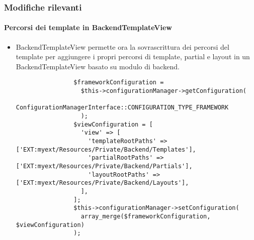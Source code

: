 \begin{frame}[fragile]
	\frametitle{Modifiche rilevanti}
	\framesubtitle{Percorsi dei template in BackendTemplateView}

	\lstset{basicstyle=\tiny\ttfamily}

	\begin{itemize}
		\item BackendTemplateView permette ora la sovrascrittura dei percorsi del template per aggiungere i propri percorsi di template,
			partial e layout in un BackendTemplateView basato su modulo di backend.

			\begin{lstlisting}
				$frameworkConfiguration =
				  $this->configurationManager->getConfiguration(
				    ConfigurationManagerInterface::CONFIGURATION_TYPE_FRAMEWORK
				  );
				$viewConfiguration = [
				  'view' => [
				    'templateRootPaths' => ['EXT:myext/Resources/Private/Backend/Templates'],
				    'partialRootPaths' => ['EXT:myext/Resources/Private/Backend/Partials'],
				    'layoutRootPaths' => ['EXT:myext/Resources/Private/Backend/Layouts'],
				  ],
				];
				$this->configurationManager->setConfiguration(
				  array_merge($frameworkConfiguration, $viewConfiguration)
				);
			\end{lstlisting}

	\end{itemize}

\end{frame}


